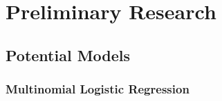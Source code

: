 \documentclass[10pt,a4paper]{article}
\begin{document}
\section{Preliminary Research}

\subsection{Potential Models}

\subsubsection{Multinomial Logistic Regression}
\end{document}
